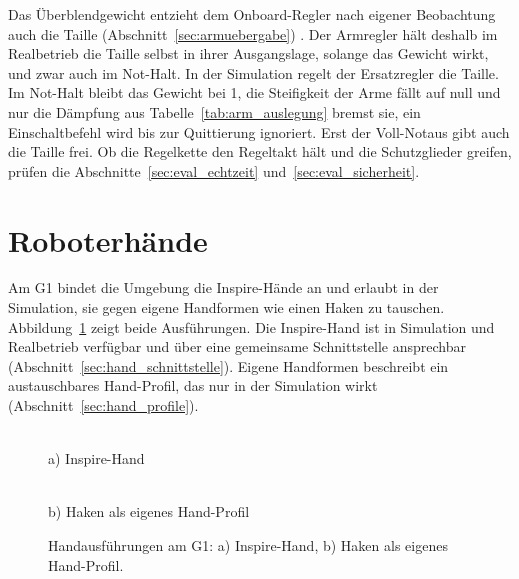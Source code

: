 Das Überblendgewicht entzieht dem Onboard-Regler nach eigener Beobachtung auch die Taille (Abschnitt~\ref{sec:armuebergabe}) .
Der Armregler hält deshalb im Realbetrieb die Taille selbst in ihrer Ausgangslage, solange das Gewicht wirkt, und zwar auch im Not-Halt. In der Simulation regelt der Ersatzregler die Taille.
Im Not-Halt bleibt das Gewicht bei 1, die Steifigkeit der Arme fällt auf null und nur die Dämpfung aus Tabelle~\ref{tab:arm_auslegung} bremst sie, ein Einschaltbefehl wird bis zur Quittierung ignoriert.
Erst der Voll-Notaus gibt auch die Taille frei.
Ob die Regelkette den Regeltakt hält und die Schutzglieder greifen, prüfen die Abschnitte~\ref{sec:eval_echtzeit} und~\ref{sec:eval_sicherheit}.


\section{Roboterhände}
\label{sec:haende}
Am G1 bindet die Umgebung die Inspire-Hände an und erlaubt in der Simulation, sie gegen eigene Handformen wie einen Haken zu tauschen.
Abbildung~\ref{fig:haende} zeigt beide Ausführungen.
Die Inspire-Hand ist in Simulation und Realbetrieb verfügbar und über eine gemeinsame Schnittstelle ansprechbar (Abschnitt~\ref{sec:hand_schnittstelle}).
Eigene Handformen beschreibt ein austauschbares Hand-Profil, das nur in der Simulation wirkt (Abschnitt~\ref{sec:hand_profile}).

\begin{figure}[htbp]
  \centering
  \begin{minipage}[t]{0.48\textwidth}
    \centering
    \\[1mm]
    {\small a) Inspire-Hand}
  \end{minipage}\hfill
  \begin{minipage}[t]{0.48\textwidth}
    \centering
    \\[1mm]
    {\small b) Haken als eigenes Hand-Profil}
  \end{minipage}
  \caption[Handausführungen am G1]{Handausführungen am G1: a) Inspire-Hand, b) Haken als eigenes Hand-Profil.}
  \label{fig:haende}
\end{figure}

